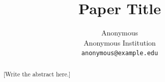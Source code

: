 \documentclass{article}
\begin{document}

\title{Paper Title}

\author{
  Anonymous \\
  Anonymous Institution \\
  \texttt{anonymous@example.edu}
}

\maketitle

\begin{abstract}

[Write the abstract here.]

\end{abstract}














\end{document}
